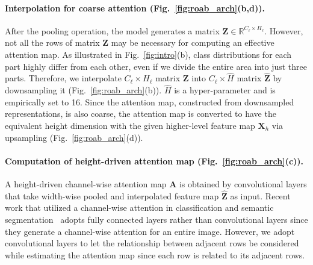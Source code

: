 \documentclass[10pt,twocolumn,letterpaper]{article}
\begin{document}
\paragraph{Interpolation for coarse attention (Fig.~\ref{fig:roab_arch}(b,d)).} \label{coarse}
\vspace*{-0.2cm}
After the pooling operation, the model generates a matrix $\mathbf{Z}\in\mathbb{R}^{C_\ell\times H_\ell}$. However, not all the rows of matrix $\mathbf{Z}$ may be necessary for computing an effective attention map. As illustrated in Fig.~\ref{fig:intro}(b), class distributions for each part highly differ from each other, even if we divide the entire area into just three parts. Therefore, we interpolate $C_\ell\times H_\ell$ matrix $\mathbf{Z}$ into $C_\ell\times \hat{H}$ matrix $\mathbf{\hat{Z}}$ by downsampling it (Fig.~\ref{fig:roab_arch}(b)).
$\hat{H}$ is a hyper-parameter and is empirically set to 16. Since the attention map, constructed from downsampled representations, is also coarse, the attention map is converted to have the equivalent height dimension with the given higher-level feature map $\mathbf{X}_h$ via upsampling (Fig.~\ref{fig:roab_arch}(d)).
\vspace*{-0.1cm}
\paragraph{Computation of height-driven attention map (Fig.~\ref{fig:roab_arch}(c)).} \label{reduction}
\vspace*{-0.3cm}
A height-driven channel-wise attention map $\mathbf{A}$ is obtained by convolutional layers that take width-wise pooled and interpolated feature map $\mathbf{\hat{Z}}$ as input. Recent work that utilized a channel-wise attention in classification and semantic segmentation~\cite{hu2018squeeze, woo2018cbam, zhang2018context} adopts fully connected layers rather than convolutional layers since they generate a channel-wise attention for an entire image. However, we adopt convolutional layers to let the relationship between adjacent rows be considered while estimating the attention map since each row is related 
to its adjacent rows.
\end{document}
